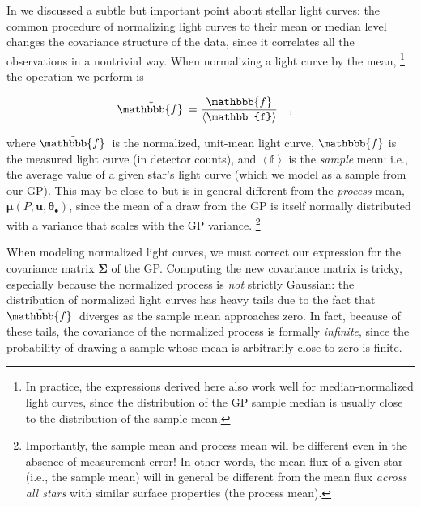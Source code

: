 \documentclass[modern,linenumbers]{aastex62}
\begin{document}
In  we discussed a subtle but important point
about stellar light curves: the common procedure of normalizing
light curves to their mean or median level changes the covariance
structure of the data, since it correlates all the observations
in a nontrivial way.
%
When normalizing a light
curve by the mean,%
\footnote{In practice, the expressions derived here also work well
    for median-normalized light curves, since the distribution of the GP sample median
    is usually close to the distribution of the sample mean.}
the operation we perform is
%
\begin{linenomath}\begin{align}
        \label{eq:ftilde}
        \tilde{\mathbbb{f}\hspace{0.2em}} & = \frac{\mathbbb{f}}{\left<\mathbb{f}\right>}
        \quad,
    \end{align}\end{linenomath}
%
where $\tilde{\mathbbb{f}\hspace{0.2em}}$ is the normalized, unit-mean light curve,
$\mathbbb{f}$ is the measured light curve (in detector counts), and
$\left<\mathbb{f}\right>$ is the \emph{sample} mean: i.e., the average value of
a given star's light curve (which we model as a sample from our GP).
This may be close to but is in general different from the \emph{process} mean,
$\pmb{\mu}(P, \mathbf{u}, \pmb{\theta}_\bullet)$, since the mean of
a draw from the GP is itself normally distributed with a variance that scales
with the GP variance.%
\footnote{
    Importantly, the sample mean and process mean will be different even in the
    absence of measurement error! In other words, the mean flux of a given
    star (i.e., the sample mean)
    will in general be different from the mean flux \emph{across all stars} with similar
    surface properties (the process mean).
}

When modeling normalized light curves, we must correct our expression for
the covariance matrix $\pmb{\Sigma}$ of the GP.
Computing the new covariance matrix is tricky, especially
because the normalized process is \emph{not} strictly Gaussian: the distribution
of normalized light curves
has heavy tails due to the fact that $\tilde{\mathbbb{f}\hspace{0.2em}}$ diverges as
the sample mean approaches zero. In fact, because of these tails, the covariance
of the normalized process is formally \emph{infinite}, since the probability of
drawing a sample whose mean is arbitrarily close to zero is finite.
\end{document}
